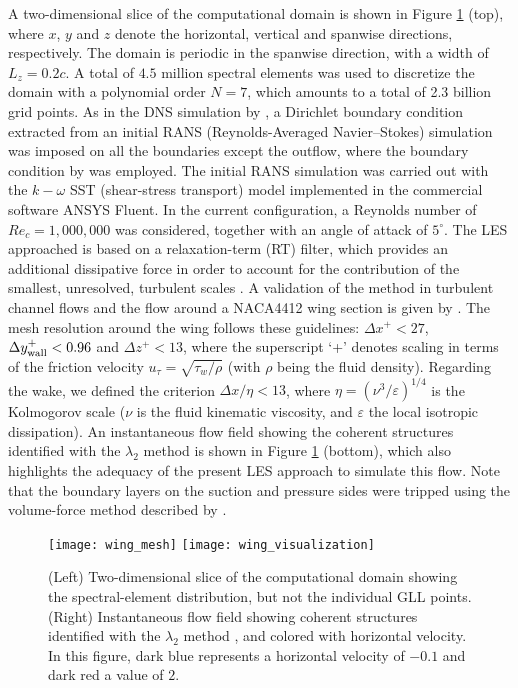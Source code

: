 A two-dimensional slice of the computational domain is shown in Figure \ref{flow_field} (top), where $x$, $y$ and $z$ denote the horizontal, vertical and spanwise directions, respectively. The domain is periodic in the spanwise direction, with a width of $L_{z}=0.2c$. A total of $4.5$ million spectral elements was used to discretize the domain with a polynomial order $N=7$, which amounts to a total of 2.3 billion grid points. As in the DNS simulation by \cite{hosseini_et_al}, a Dirichlet boundary condition extracted from an initial RANS (Reynolds-Averaged Navier--Stokes) simulation was imposed on all the boundaries except the outflow, where the boundary condition by \cite{dong_et_al} was employed. The initial RANS simulation was carried out with the $k-\omega$ SST (shear-stress transport) model \citep{menter} implemented in the commercial software ANSYS Fluent. In the current configuration, a Reynolds number of $Re_{c}=1,000,000$ was considered, together with an angle of attack of $5^{\circ}$. The LES approached is based on a relaxation-term (RT) filter, which provides an additional dissipative force in order to account for the contribution of the smallest, unresolved, turbulent scales \citep{schlatter_et_al_2004}. A validation of the method in turbulent channel flows and the flow around a NACA4412 wing section is given by \cite{negi_et_al}.  The mesh resolution around the wing follows these guidelines: $\Delta x^{+} < 27$, $\Delta y^{+}_{{\rm wall}} < 0.96$ and $\Delta z^{+} < 13$, where the superscript `+' denotes scaling in terms of the friction velocity $u_{\tau}=\sqrt{\tau_{w} / \rho}$ (with $\rho$ being the fluid density). Regarding the wake, we defined the criterion $\Delta x / \eta < 13$, where $\eta=\left ( \nu^{3} / \varepsilon \right )^{1/4}$ is the Kolmogorov scale ($\nu$ is the fluid kinematic viscosity, and $\varepsilon$ the local isotropic dissipation). An instantaneous flow field showing the coherent structures identified with the $\lambda_{2}$ method \citep{jeong_hussain} is shown in Figure \ref{flow_field} (bottom), which also highlights the adequacy of the present LES approach to simulate this flow. Note that the boundary layers on the suction and pressure sides were tripped using the volume-force method described by \cite{schlatter_orlu12}.
\begin{figure}[t]
\centering
\texttt{[image: wing\_mesh]}
\texttt{[image: wing\_visualization]}
\caption{(Left) Two-dimensional slice of the computational domain showing the spectral-element distribution, but not the individual GLL points. (Right) Instantaneous flow field showing coherent structures identified with the $\lambda_{2}$ method \citep{jeong_hussain}, and colored with horizontal velocity. In this figure, dark blue represents a horizontal velocity of $-0.1$ and dark red a value of $2$.}
\label{flow_field}
\end{figure}

